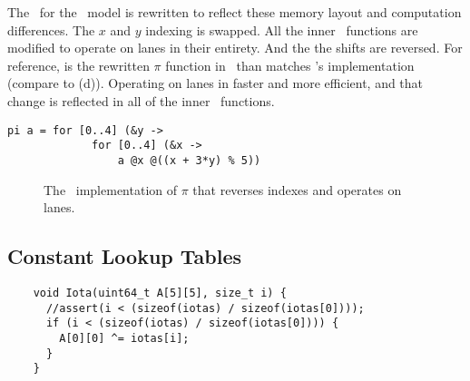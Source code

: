 The \cryptol\ for the \fips\ model is rewritten to reflect these memory layout and computation differences.
The $x$ and $y$ indexing is swapped.
All the inner \keccak\ functions are modified to operate on lanes in their entirety.
And the the shifts are reversed.
For reference,  is the rewritten $\pi$ function in \cryptol\ than matches \openssl's implementation (compare to (d)).
Operating on lanes in faster and more efficient, and that change is reflected in all of the inner \keccak\ functions.

\newsavebox{\PiOpenSSL}
\begin{lrbox}{\PiOpenSSL}
  \begin{lstlisting}[language=Cryptol]
    pi a = for [0..4] (&y ->
             for [0..4] (&x -> 
                 a @x @((x + 3*y) % 5))
  \end{lstlisting}
\end{lrbox}

\begin{figure}
  \begin{center}
    \usebox{\PiOpenSSL}
  \end{center}
  \caption{The \openssl\ implementation of $\pi$ that reverses indexes and operates on lanes.}
  \label{fig:piopenssl}
\end{figure}

\subsection{Constant Lookup Tables}

\newsavebox{\ciota}
\begin{lrbox}{\ciota}
  \begin{lstlisting}
    void Iota(uint64_t A[5][5], size_t i) {
      //assert(i < (sizeof(iotas) / sizeof(iotas[0])));
      if (i < (sizeof(iotas) / sizeof(iotas[0]))) {
        A[0][0] ^= iotas[i];
      }
    }
  \end{lstlisting}    
\end{lrbox}


